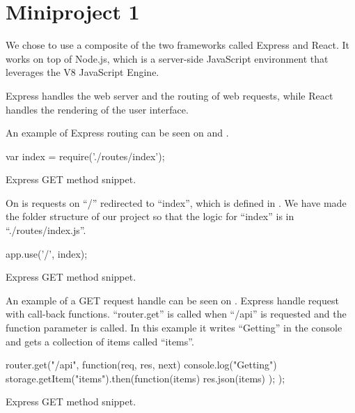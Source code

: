 \chapter{Miniproject 1}
We chose to use a composite of the two frameworks called Express and React. 
It works on top of Node.js, which is a server-side JavaScript environment that leverages the V8 JavaScript Engine. 

Express handles the web server and the routing of web requests, while React handles the rendering of the user interface.

An example of Express routing can be seen on  and .

\begin{listing}
    \begin{js}
        var index = require('./routes/index');
    \end{js}
    \caption{Express GET method snippet.}
    \label{lst:express_route}
\end{listing}

On  is requests on ``/'' redirected to ``index'', which is defined in .
We have made the folder structure of our project so that the logic for ``index'' is in ``./routes/index.js''.

\begin{listing}
    \begin{js}
        app.use('/', index);
    \end{js}
    \caption{Express GET method snippet.}
    \label{lst:express_route_use}
\end{listing}

An example of a GET request handle can be seen on .
Express handle request with call-back functions.
``router.get'' is called when ``/api'' is requested and the function parameter is called. 
In this example it writes ``Getting'' in the console and gets a collection of items called ``items''.

\begin{listing}
    \begin{js}
        router.get("/api", function(req, res, next) {
            console.log("Getting")
            storage.getItem("items").then(function(items) {
                res.json(items)
            });
        });
    \end{js}
    \caption{Express GET method snippet.}
    \label{lst:express_get}
\end{listing}

